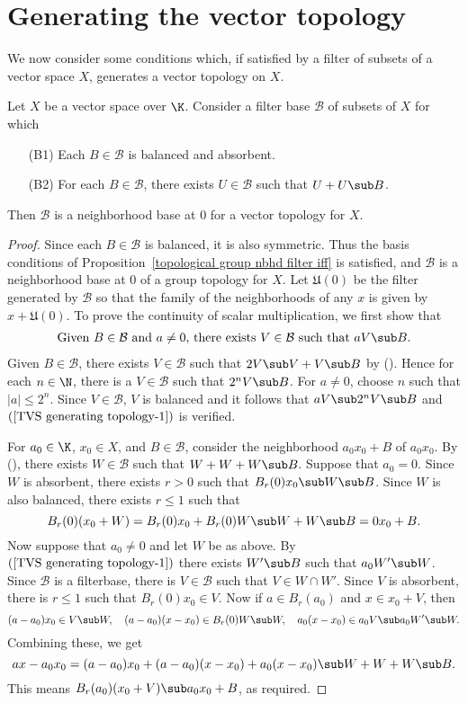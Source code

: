 \section{Generating the vector topology}
We now consider some conditions which, if satisfied by a filter of subsets of a vector space $X$, generates a vector topology on $X$.
\begin{theorem}\label{TVS generating topology}
Let $X$ be a vector space over $\K$. Consider a filter base $\mathcal{B}$ of subsets of $X$ for which
\begin{itemize}
\item[(B1)] Each $B\in\mathcal{B}$ is balanced and absorbent. 
\item[(B2)] For each $B\in\mathcal{B}$, there exists $U\in\mathcal{B}$ such that $U+U\sub B$.
\end{itemize}
Then $\mathcal{B}$ is a neighborhood base at $0$ for a vector topology for $X$.
\end{theorem}
\begin{proof}
Since each $B\in\mathcal{B}$ is balanced, it is also symmetric. Thus the basis conditions of Proposition~\ref{topological group nbhd filter iff} is satisfied, and $\mathcal{B}$ is a neighborhood base at $0$ of a group topology for $X$. Let $\mathfrak{U}(0)$ be the filter generated by $\mathcal{B}$ so that the family of the neighborhoods of any $x$ is given by $x+\mathfrak{U}(0)$. To prove the continuity of scalar multiplication, we first show that
\begin{align}\label{TVS generating topology-1}
\text{Given $B\in\mathcal{B}$ and $a\neq 0$, there exists $V\in\mathcal{B}$ such that $aV\sub B$.}
\end{align}
Given $B\in\mathcal{B}$, there exists $V\in\mathcal{B}$ such that $2V\sub V+V\sub B$ by (). Hence for each $n\in\N$, there is a $V\in\mathcal{B}$ such that $2^nV\sub B$. For $a\neq 0$, choose $n$ such that $|a|\leq 2^n$. Since $V\in\mathcal{B}$, $V$ is balanced and it follows that $aV\sub 2^nV\sub B$ and $(\ref{TVS generating topology-1})$ is verified.\par
For $a_0\in\K$, $x_0\in X$, and $B\in\mathcal{B}$, consider the neighborhood $a_0x_0+B$ of $a_0x_0$. By (), there exists $W\in\mathcal{B}$ such that $W+W+W\sub B$. Suppose that $a_0=0$. Since $W$ is absorbent, there exists $r>0$ such that $B_r(0)x_0\sub W\sub B$. Since $W$ is also balanced, there exists $r\leq 1$ such that
\[B_r(0)(x_0+W)=B_r(0)x_0+B_r(0)W\sub W+W\sub B=0x_0+B.\]
Now suppose that $a_0\neq 0$ and let $W$ be as above. By $(\ref{TVS generating topology-1})$ there exists $W'\sub B$ such that $a_0W'\sub W$. Since $\mathcal{B}$ is a filterbase, there is $V\in\mathcal{B}$ such that $V\in W\cap W'$. Since $V$ is absorbent, there is $r\leq 1$ such that $B_r(0)x_0\in V$. Now if $a\in B_r(a_0)$ and $x\in x_0+V$, then
\[(a-a_0)x_0\in V\sub W,\quad (a-a_0)(x-x_0)\in B_r(0)W\sub W,\quad a_0(x-x_0)\in a_0V\sub a_0W'\sub W.\]
Combining these, we get
\[ax-a_0x_0=(a-a_0)x_0+(a-a_0)(x-x_0)+a_0(x-x_0)\sub W+W+W\sub B.\]
This means $B_r(a_0)(x_0+V)\sub a_0x_0+B$, as required. 
\end{proof}
